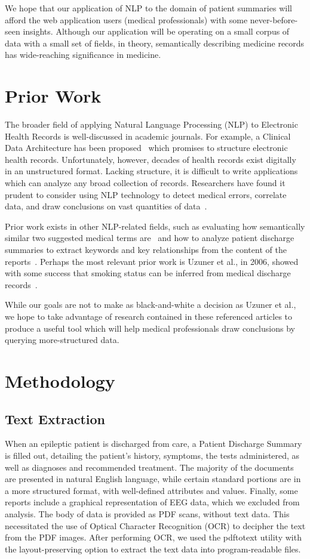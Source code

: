 \documentclass{acm_proc_article-sp}
\begin{document}
We hope that our application of NLP to the domain of patient summaries will afford the
web application users (medical professionals) with some never-before-seen insights.
Although our application will be operating on a small corpus of data with a small set 
of fields, in theory, semantically describing medicine records has wide-reaching 
significance in medicine.

\section{Prior Work}
The broader field of applying Natural Language Processing (NLP) to Electronic Health Records
is well-discussed in academic journals. For example, a Clinical Data Architecture has been
proposed~\cite{CDA} which promises to structure electronic health records. Unfortunately, however,
decades of health records exist digitally in an unstructured format. Lacking structure, it is
difficult to write applications which can analyze any broad collection of records. Researchers
have found it prudent to consider using NLP technology to detect medical errors, correlate data, 
and draw conclusions on vast quantities of data~\cite{friedman}.

Prior work exists in other NLP-related fields, such as evaluating how semantically similar 
two suggested medical terms are~\cite{Pedersen2007288} and how to analyze patient
discharge summaries to extract keywords and key relationships from the content of the
reports~\cite{soderland}. Perhaps the most relevant prior work is Uzuner et al., in 2006,
showed with some success that smoking status can be inferred from medical discharge 
records~\cite{Uzuner200814}.

While our goals are not to make as black-and-white a decision as Uzuner et al., we hope to take 
advantage of research contained in these referenced articles to produce a useful tool which will
help medical professionals draw conclusions by querying more-structured data.

\section{Methodology}
\subsection{Text Extraction}
When an epileptic patient is discharged from care, a Patient Discharge Summary is
filled out, detailing the patient's history, symptoms, the tests administered, as
well as diagnoses and recommended treatment. The majority of the documents are
presented in natural English language, while certain standard portions are in a
more structured format, with well-defined attributes and values. Finally, some
reports include a graphical representation of EEG data, which we excluded from analysis.
The body of data is provided as PDF scans, without text data. This necessitated the use
of Optical Character Recognition (OCR) to decipher the text from the PDF images.
After performing OCR, we used the pdftotext utility with the layout-preserving option
to extract the text data into program-readable files.
\end{document}
